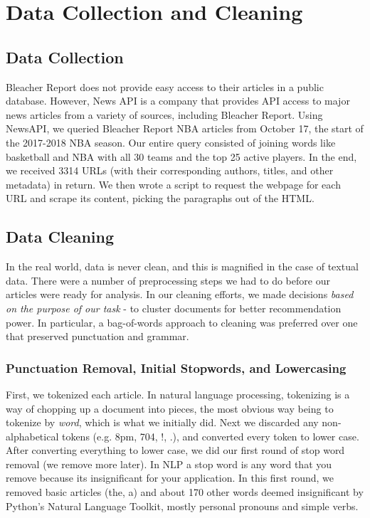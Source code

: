 \documentclass[11pt]{article}
\begin{document}



\section{Data Collection and Cleaning}
\subsection{Data Collection}
Bleacher Report does not provide easy access to their articles in a public database.  However, News API is a company that provides API access to major news articles from a variety of sources, including Bleacher Report.  Using NewsAPI, we queried Bleacher Report NBA articles from October 17, the start of the 2017-2018 NBA season. Our entire query consisted of joining words like basketball and NBA with all 30 teams and the top 25 active players.  In the end, we received 3314 URLs (with their corresponding authors, titles, and other metadata) in return.  We then wrote a script to request the webpage for each URL and scrape its content, picking the paragraphs out of the HTML.

\subsection{Data Cleaning}
In the real world, data is never clean, and this is magnified in the case of textual data. There were a number of preprocessing steps we had to do before our articles were ready for analysis. In our cleaning efforts, we made decisions \textit{based on the purpose of our task} - to cluster documents for better recommendation power.  In particular, a bag-of-words approach to cleaning was preferred over one that preserved punctuation and grammar.  \\

\subsubsection{Punctuation Removal, Initial Stopwords, and Lowercasing}
First, we tokenized each article. In natural language processing, tokenizing is a way of chopping up a document into pieces, the most obvious way being to tokenize by \textit{word}, which is what we initially did.  Next we discarded any non-alphabetical tokens (e.g. 8pm, 704, !, .), and converted every token to lower case.  After converting everything to lower case, we did our first round of stop word removal (we remove more later).  In  NLP a stop word is any word that you remove because its insignificant for your application. In this first round, we removed basic articles (the, a) and about 170 other words deemed insignificant by Python's Natural Language Toolkit, mostly personal pronouns and simple verbs.
\end{document}
